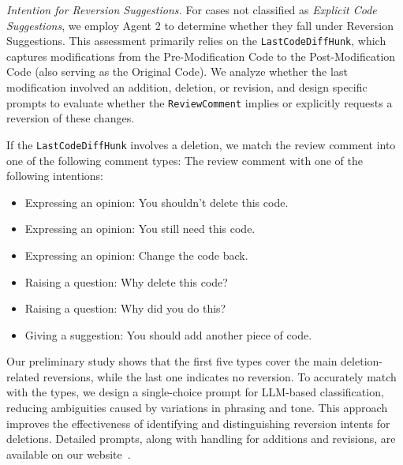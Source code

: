 \textit{Intention for Reversion Suggestions.} For cases not classified as \textit{Explicit Code Suggestions}, we employ Agent 2 to determine whether they fall under Reversion Suggestions. This assessment primarily relies on the \texttt{LastCodeDiffHunk}, which captures modifications from the Pre-Modification Code to the Post-Modification Code (also serving as the Original Code). We analyze whether the last modification involved an addition, deletion, or revision, and design specific prompts to evaluate whether the \texttt{ReviewComment} implies or explicitly requests a reversion of these changes.

If the \texttt{LastCodeDiffHunk} involves a deletion, we match the review comment into one of the following comment types:
The review comment with one of the following intentions:
 \begin{itemize}[leftmargin=*,topsep=2pt]
        \item  Expressing an opinion: You shouldn't delete this code.
        \item Expressing an opinion: You still need this code.
        \item Expressing an opinion: Change the code back.
        \item  Raising a question: Why delete this code?
        \item  Raising a question: Why did you do this?
        \item Giving a suggestion: You should add another piece of code.
\end{itemize}
Our preliminary study shows that the first five types cover the main deletion-related reversions, while the last one indicates no reversion. To accurately match with the types, we design a single-choice prompt for LLM-based classification, reducing ambiguities caused by variations in phrasing and tone. This approach improves the effectiveness of identifying and distinguishing reversion intents for deletions. Detailed prompts, along with handling for additions and revisions, are available on our website~\cite{IntentionWebsite}.





